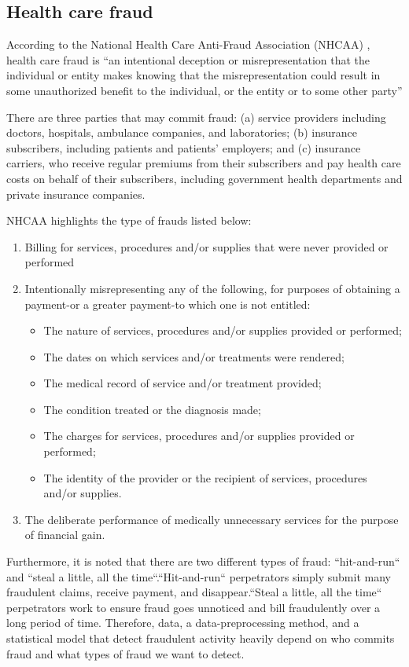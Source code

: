 \documentclass[dvipdfmx, english]{ampmt}             %
\begin{document}
\subsection{Health care fraud}
According to the National Health Care Anti-Fraud Association (NHCAA) \cite{Nhcaa}, health care fraud is ``an intentional deception or misrepresentation that the individual or entity makes knowing that the misrepresentation could result in some unauthorized benefit to the individual, or the entity or to some other party''
\par
There are three parties that may commit fraud: (a) service providers including doctors, hospitals, ambulance companies, and laboratories; (b) insurance subscribers, including patients and patients’{} employers; and (c) insurance carriers, who receive regular premiums from their subscribers and pay health care costs on behalf of their subscribers, including government health departments and private insurance companies\cite{Survey}.

NHCAA highlights the type of frauds listed below:

\begin{enumerate}
\item	Billing for services, procedures and/or supplies that were never provided or performed
\item Intentionally misrepresenting any of the following, for purposes of obtaining a payment-or a greater payment-to which one is not entitled:
	\begin{itemize}
		\item The nature of services, procedures and/or supplies provided or performed;
		\item The dates on which services and/or treatments were rendered;
		\item The medical record of service and/or treatment provided;
		\item The condition treated or the diagnosis made;
		\item The charges for services, procedures and/or supplies provided or performed;
		\item The identity of the provider or the recipient of services, procedures and/or supplies.
	\end{itemize}
\item The deliberate performance of medically unnecessary services for the purpose of financial gain.
\end{enumerate}

Furthermore, it is noted that there are two different types of fraud: ``hit-and-run“ and ``steal a little, all the time“\cite{Survey, Multidim}.``Hit-and-run“ perpetrators simply submit many fraudulent claims, receive payment, and disappear.``Steal a little, all the time“ perpetrators work to ensure fraud goes unnoticed and bill fraudulently over a long period of time.
Therefore, data, a data-preprocessing method, and a statistical model that detect fraudulent activity heavily depend on who commits fraud and what types of fraud we want to detect.
\end{document}

